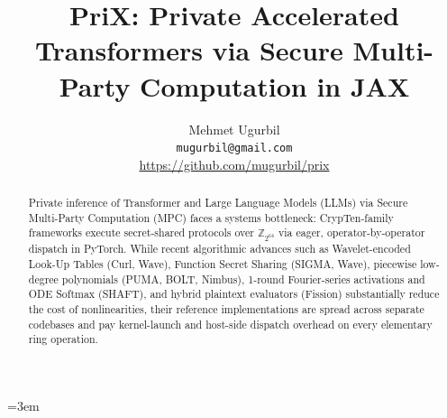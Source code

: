 \documentclass[11pt]{article}
\title{\textbf{PriX: Private Accelerated Transformers via Secure Multi-Party Computation in JAX}}
\author{
  Mehmet Ugurbil \\
  \texttt{mugurbil@gmail.com} \\
  \small \url{https://github.com/mugurbil/prix}
}
\date{}
\newcommand{\Zring}{\mathbb{Z}_{2^{64}}}
\begin{document}
\emergencystretch=3em

\maketitle

\begin{abstract}
Private inference of Transformer and Large Language Models (LLMs) via Secure Multi-Party Computation (MPC) faces a systems bottleneck: CrypTen-family frameworks execute secret-shared protocols over $\Zring$ via eager, operator-by-operator dispatch in PyTorch. While recent algorithmic advances such as Wavelet-encoded Look-Up Tables (Curl, Wave), Function Secret Sharing (SIGMA, Wave), piecewise low-degree polynomials (PUMA, BOLT, Nimbus), 1-round Fourier-series activations and ODE Softmax (SHAFT), and hybrid plaintext evaluators (Fission) substantially reduce the cost of nonlinearities, their reference implementations are spread across separate codebases and pay kernel-launch and host-side dispatch overhead on every elementary ring operation.


\end{abstract}
\end{document}
